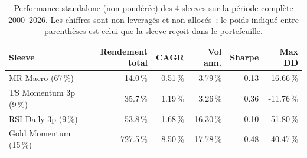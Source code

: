 \begin{table}[H]
\centering
\caption{Performance standalone (non pondérée) des 4 sleeves sur la période complète 2000--2026. Les chiffres sont non-leveragés et non-allocés~; le poids indiqué entre parenthèses est celui que la sleeve reçoit dans le portefeuille.}
\label{tab:sleeve_standalone}
\begin{tabular}{lrrrrr}
\toprule
Sleeve & Rendement total & CAGR & Vol ann. & Sharpe & Max DD \\
\midrule
MR Macro (67\,\%) & 14.0\,\% & 0.51\,\% & 3.79\,\% & 0.13 & -16.66\,\% \\
TS Momentum 3p (9\,\%) & 35.7\,\% & 1.19\,\% & 3.26\,\% & 0.36 & -11.76\,\% \\
RSI Daily 3p (9\,\%) & 53.8\,\% & 1.68\,\% & 16.30\,\% & 0.10 & -51.80\,\% \\
Gold Momentum (15\,\%) & 727.5\,\% & 8.50\,\% & 17.78\,\% & 0.48 & -40.47\,\% \\
\bottomrule
\end{tabular}
\end{table}
